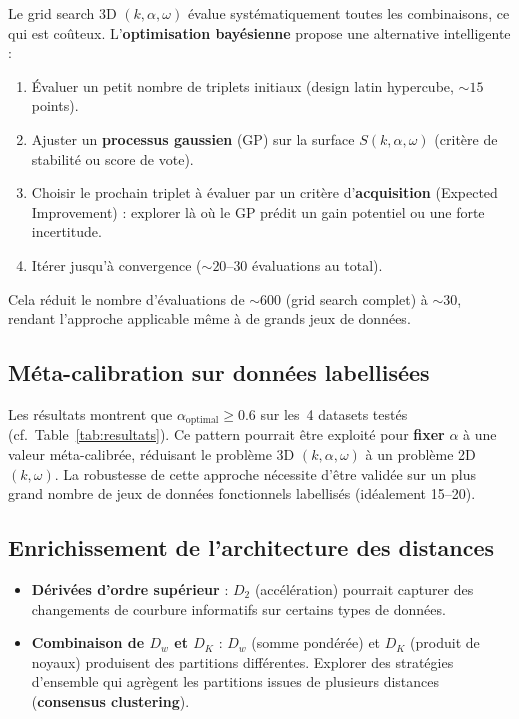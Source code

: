 \documentclass[11pt, a4paper]{article}
\newcommand{\Dw}{D_w}
\newcommand{\DK}{D_K}
\begin{document}
Le grid search 3D $(k, \alpha, \omega)$ évalue systématiquement toutes les
combinaisons, ce qui est coûteux. L'\textbf{optimisation bayésienne}
propose une alternative intelligente :

\begin{enumerate}[nosep]
  \item Évaluer un petit nombre de triplets initiaux (design latin
    hypercube, $\sim 15$ points).
  \item Ajuster un \textbf{processus gaussien} (GP) sur la surface
    $S(k, \alpha, \omega)$ (critère de stabilité ou score de vote).
  \item Choisir le prochain triplet à évaluer par un critère
    d'\textbf{acquisition} (Expected Improvement) : explorer là où le GP
    prédit un gain potentiel ou une forte incertitude.
  \item Itérer jusqu'à convergence ($\sim 20$--$30$ évaluations au total).
\end{enumerate}

Cela réduit le nombre d'évaluations de $\sim 600$ (grid search complet) à
$\sim 30$, rendant l'approche applicable même à de grands jeux de données.

\subsection{Méta-calibration sur données labellisées}

Les résultats montrent que $\alpha_{\text{optimal}} \geq 0.6$ sur les~4
datasets testés (cf.~Table~\ref{tab:resultats}). Ce pattern pourrait être
exploité pour \textbf{fixer} $\alpha$ à une valeur méta-calibrée, réduisant
le problème 3D $(k, \alpha, \omega)$ à un problème 2D $(k, \omega)$. La
robustesse de cette approche nécessite d'être validée sur un plus grand
nombre de jeux de données fonctionnels labellisés (idéalement 15--20).

\subsection{Enrichissement de l'architecture des distances}

\begin{itemize}
  \item \textbf{Dérivées d'ordre supérieur} : $D_2$ (accélération) pourrait
    capturer des changements de courbure informatifs sur certains types de
    données.
  \item \textbf{Combinaison de $\Dw$ et $\DK$} : $\Dw$ (somme pondérée) et
    $\DK$ (produit de noyaux) produisent des partitions différentes.
    Explorer des stratégies d'ensemble qui agrègent les partitions issues de
    plusieurs distances (\textbf{consensus clustering}).
\end{itemize}
\end{document}
